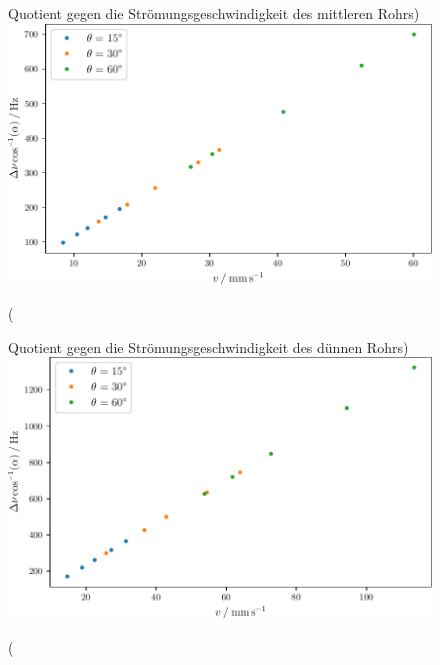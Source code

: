 \begin{figure}
    \centering
    \caption(Quotient gegen die Strömungsgeschwindigkeit des mittleren Rohrs)
    \label{fig:middle}
    \includegraphics{build/middle.pdf}
\end{figure}
\begin{figure}
    \centering
    \caption(Quotient gegen die Strömungsgeschwindigkeit des dünnen Rohrs)
    \label{fig:tiny}
    \includegraphics{build/tiny.pdf}
\end{figure}